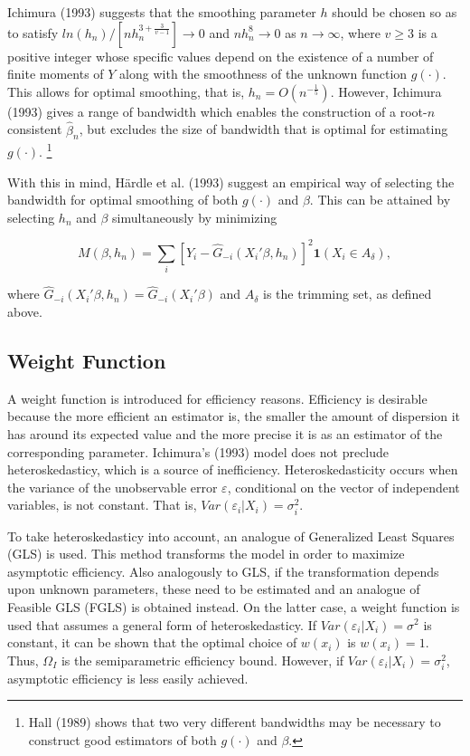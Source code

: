 \documentclass[a4paper]{article}
\begin{document}
Ichimura (1993) suggests that the smoothing parameter $h$ should be chosen so as to satisfy
 $ln(h_n)/[nh_n^{3 + \frac{3}{v-1}}] \rightarrow 0$ and $nh_n^8 \rightarrow 0$ as $n \rightarrow \infty $, where $v \geq 3$ is a positive integer whose specific values depend on the existence of a number of finite moments  of $Y$ along with the smoothness of the unknown function $g(\cdot)$. This allows for optimal smoothing, that is, $h_n = O(n^{-\frac{1}{5}})$. However, Ichimura (1993) gives a range of bandwidth which enables the construction of a root-$n$ consistent $\hat{\beta}_n$, but excludes the size of bandwidth that is optimal for estimating $g(\cdot)$. \footnote{Hall (1989) shows that two very different bandwidths may be necessary to construct good estimators of both $g(\cdot)$ and $\beta$.}
 
With this in mind, H{\"a}rdle et al. (1993) suggest an empirical way of selecting the bandwidth for optimal smoothing of both $g(\cdot)$ and $\beta$. This can be attained by selecting $h_n$ and $\beta$ simultaneously by minimizing

\begin{equation}
M(\beta, h_n) = \sum_i \left[ Y_i - \hat{G}_{-i}(X_i'\beta, h_n) \right]^2\mathbf{1}{(X_i \in A_\delta)},
\end{equation}

where $\hat{G}_{-i}(X_i'\beta, h_n) = \hat{G}_{-i}(X_i'\beta)$ and $A_\delta$ is the trimming set, as defined above.	

\subsection{Weight Function} %
\label{sub:Weight Function}

A weight function is introduced for efficiency reasons. Efficiency is desirable because the more efficient an estimator is, the smaller the amount of dispersion it has around its expected value and the more precise it is as an estimator of the corresponding parameter. Ichimura's (1993) model does not preclude heteroskedasticy, which is a source of inefficiency.  Heteroskedasticity occurs when the variance of the unobservable error $\varepsilon$, conditional on  the vector of independent variables, is not constant. That is, $Var(\varepsilon_i|X_i) = \sigma_i^2$.  

To take heteroskedasticy into account, an analogue of Generalized Least Squares (GLS) is used. This method transforms the model in order to maximize asymptotic efficiency. Also analogously to GLS, if the transformation depends upon unknown parameters, these need to be estimated and an analogue of Feasible GLS (FGLS) is obtained instead. On the latter case, a weight function is used that assumes a general form of heteroskedasticy.
If $Var(\varepsilon_i|X_i) = \sigma^2$ is constant, it can be shown that the optimal choice of $w(x_i)$ is $w(x_i)=1$. Thus, $\Omega_I$ is the semiparametric efficiency bound. However, if $Var(\varepsilon_i|X_i) = \sigma_i^2$, asymptotic efficiency is less easily achieved.  
\end{document}
